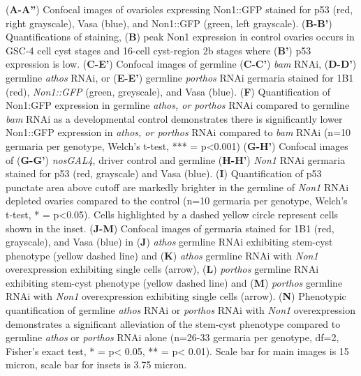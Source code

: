 \documentclass[12pt,oneside]{reedthesis}
\begin{document}
\setlength\parindent{0pt}(\textbf{A-A''}) Confocal images of ovarioles expressing Non1::GFP stained for p53 (red, right grayscale), Vasa (blue), and Non1::GFP (green, left grayscale). (\textbf{B-B'}) Quantifications of staining, (\textbf{B}) peak Non1 expression in control ovaries occurs in GSC-4 cell cyst stages and 16-cell cyst-region 2b stages where (\textbf{B'}) p53 expression is low. (\textbf{C-E'}) Confocal images of germline (\textbf{C-C'}) \emph{bam} RNAi, (\textbf{D-D'}) germline \emph{athos} RNAi, or (\textbf{E-E'}) germline \emph{porthos} RNAi germaria stained for 1B1 (red), \emph{Non1::GFP} (green, greyscale), and Vasa (blue). (\textbf{F}) Quantification of Non1:GFP expression in germline \emph{athos, or porthos} RNAi compared to germline \emph{bam} RNAi as a developmental control demonstrates there is significantly lower Non1::GFP expression in \emph{athos, or porthos} RNAi compared to \emph{bam} RNAi (n=10 germaria per genotype, Welch's t-test, *** = p\textless0.001) (\textbf{G-H'}) Confocal images of (\textbf{G-G'}) \emph{nosGAL4}, driver control and germline (\textbf{H-H'}) \emph{Non1} RNAi germaria stained for p53 (red, grayscale) and Vasa (blue). (\textbf{I}) Quantification of p53 punctate area above cutoff are markedly brighter in the germline of \emph{Non1} RNAi depleted ovaries compared to the control (n=10 germaria per genotype, Welch's t-test, * = p\textless0.05). Cells highlighted by a dashed yellow circle represent cells shown in the inset. (\textbf{J-M}) Confocal images of germaria stained for 1B1 (red, grayscale), and Vasa (blue) in (\textbf{J}) \emph{athos} germline RNAi exhibiting stem-cyst phenotype (yellow dashed line) and (\textbf{K}) \emph{athos} germline RNAi with \emph{Non1} overexpression exhibiting single cells (arrow), (\textbf{L}) \emph{porthos} germline RNAi exhibiting stem-cyst phenotype (yellow dashed line) and (\textbf{M}) \emph{porthos} germline RNAi with \emph{Non1} overexpression exhibiting single cells (arrow). (\textbf{N}) Phenotypic quantification of germline \emph{athos} RNAi or \emph{porthos} RNAi with \emph{Non1} overexpression demonstrates a significant alleviation of the stem-cyst phenotype compared to germline \emph{athos} or \emph{porthos} RNAi alone (n=26-33 germaria per genotype, df=2, Fisher's exact test, * = p\textless{} 0.05, ** = p\textless{} 0.01). Scale bar for main images is 15 micron, scale bar for insets is 3.75 micron.

\setlength\parindent{24pt}

\textbf{\hfill\break
}
\end{document}
